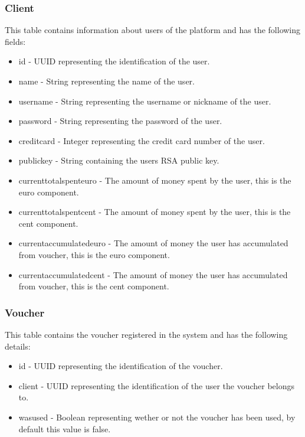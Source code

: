 \documentclass[12pt]{article}
\begin{document}
\subsubsection{Client}
This table contains information about users of the platform and has the following fields:
\begin{itemize}
    \item id - UUID representing the identification of the user.
    \item name - String representing the name of the user.
    \item username - String representing the username or nickname of the user.
    \item password - String representing the password of the user.
    \item credit\textunderscore card - Integer representing the credit card number of the user.
    \item public\textunderscore key - String containing the users RSA public key.
    \item current\textunderscore total\textunderscore spent\textunderscore euro - The amount of money spent by the user, this is the euro component.
    \item current\textunderscore total\textunderscore spent\textunderscore cent - The amount of money spent by the user, this is the cent component.
    \item current\textunderscore accumulated\textunderscore euro - The amount of money the user has accumulated from voucher, this is the euro component.
    \item current\textunderscore accumulated\textunderscore cent - The amount of money the user has accumulated from voucher, this is the cent component.
\end{itemize}


\subsubsection{Voucher}
This table contains the voucher registered in the system and has the following details:
\begin{itemize}
    \item id - UUID representing the identification of the voucher.
	\item client - UUID representing the identification of the user the voucher belongs to.
	\item was\textunderscore used - Boolean representing wether or not the voucher has been used, by default this value is false.
\end{itemize}
\end{document}
